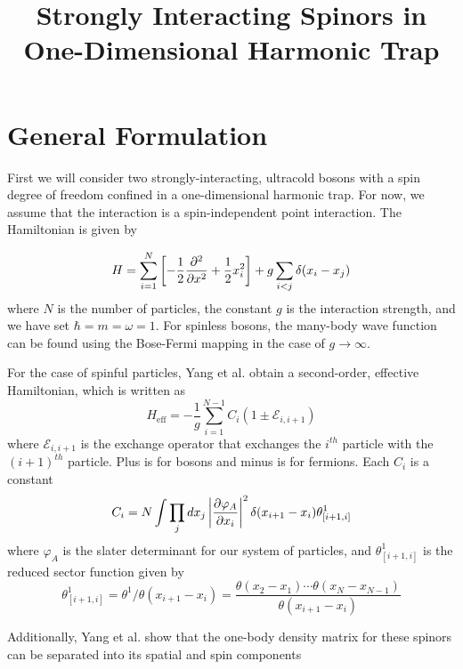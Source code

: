 \documentclass[onecolumn,english,aps,pra]{revtex4}
\begin{document}
\title{Strongly Interacting Spinors in One-Dimensional Harmonic Trap}

\maketitle

\section{General Formulation}

First we will consider two strongly-interacting, ultracold bosons with a spin degree of freedom confined in a one-dimensional harmonic trap. For now, we assume that the interaction is a spin-independent point interaction. The Hamiltonian is given by

\begin{equation}
    H = \sum_{i = 1}^{N} \left[ -\frac{1}{2} \pdv[2]{}{x} + \frac{1}{2} x_i^2 \right]
            + g \sum_{i < j} \delta(x_i - x_j)
	\end{equation}
%
where $N$ is the number of particles, the constant $g$ is the interaction strength, and we have set $\hbar = m = \omega = 1$. For spinless bosons, the many-body wave function can be found using the Bose-Fermi mapping \cite{girardeau1960relationship} in the case of $g \rightarrow \infty$.

For the case of spinful particles, Yang et al. \cite{yang2015strongly} obtain a second-order, effective Hamiltonian, which is written as
%
\begin{equation}
H_{\text{eff}} = -\frac{1}{g} \sum_{i = 1}^{N - 1}C_i(1 \pm \mathcal{E}_{i, i+1})
\label{spinchain}
\end{equation}
%
where $\mathcal{E}_{i, i+1}$ is the exchange operator that exchanges the $i^{th}$ particle with the $(i + 1)^{th}$ particle. Plus is for bosons and minus is for fermions. Each $C_i$ is a constant 
%
\begin{equation}
C_i = N \int \prod_j dx_j \left| \pdv{\varphi_A}{x_i} \right|^2 \delta(x_{i + 1} - x_{i}) \theta^1_{[i+1, i]}
\end{equation}
%
where $\varphi_A$ is the slater determinant for our system of particles, and $\theta^1_{[i+1, i]}$ is the reduced sector function given by
%
\[ \theta^1_{[i+1, i]} = \theta^1 / \theta(x_{i + 1} - x_i) 
= \frac{\theta(x_2 - x_1) \cdots \theta(x_N - x_{N-1})}{\theta(x_{i + 1} - x_i)} \]

Additionally, Yang et al. show that the one-body density matrix for these spinors can be separated into its spatial and spin components
\end{document}
